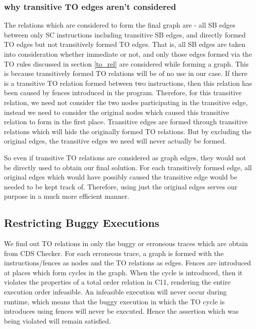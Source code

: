 \subsubsection{why transitive TO edges aren't considered}
The relations which are considered to form the final graph are - all SB edges between only SC instructions including transitive SB edges, and directly formed TO edges but not transitively formed TO edges. That is, all SB edges are taken into consideration whether immediate or not, and only those edges formed via the TO rules discussed in section \ref{to_rel} are considered while forming a graph. This is because transitively formed TO relations will be of no use in our case. If there is a transitive TO relation formed between two instructions, then this relation has been caused by fences introduced in the program. Therefore, for this transitive relation, we need not consider the two nodes participating in the transitive edge, instead we need to consider the original nodes which caused this transitive relation to form in the first place. Transitive edges are formed through transitive relations which will hide the originally formed TO relations. But by excluding the original edges, the transitive edges we need will never actually be formed.



\par
So even if transitive TO relations are considered as graph edges, they would not be directly used to obtain our final solution. For each transitively formed edge, all original edges which would have possibly caused the transitive edge would be needed to be kept track of. Therefore, using just the original edges serves our purpose in a much more efficient manner.

\subsection{Restricting Buggy Executions}
\par
We find out TO relations in only the buggy or erroneous traces which are obtain from CDS Checker. For each erroneous trace, a graph is formed with the instructions/fences as nodes and the TO relations as edges. Fences are introduced at places which form cycles in the graph. When the cycle is introduced, then it violates the properties of a total order relation in C11, rendering the entire execution order infeasible. An infeasible execution will never occur during runtime, which means that the buggy execution in which the TO cycle is introduces using fences will never be executed. Hence the assertion which was being violated will remain satisfied. 

